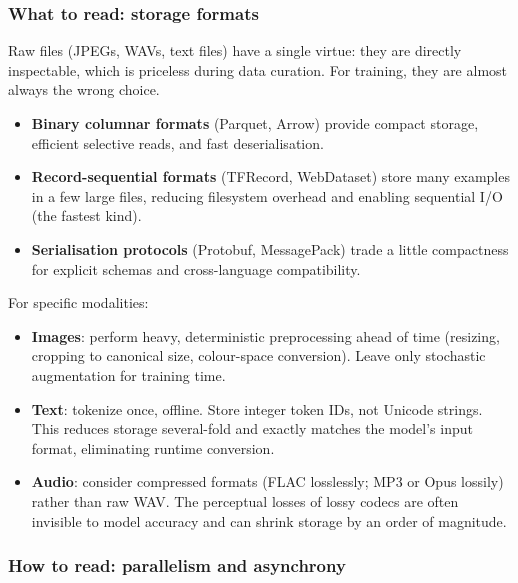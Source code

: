 \documentclass[11pt,a4paper]{article}
\theoremstyle{definition}
\theoremstyle{remark}
\theoremstyle{plain}
\begin{document}
\subsubsection*{What to read: storage formats}

Raw files (JPEGs, WAVs, text files) have a single virtue: they are
directly inspectable, which is priceless during data curation. For
training, they are almost always the wrong choice.

\begin{itemize}[leftmargin=1.5em, itemsep=2pt]
    \item \textbf{Binary columnar formats} (Parquet, Arrow) provide
          compact storage, efficient selective reads, and fast
          deserialisation.
    \item \textbf{Record-sequential formats} (TFRecord, WebDataset) store
          many examples in a few large files, reducing filesystem
          overhead and enabling sequential I/O (the fastest kind).
    \item \textbf{Serialisation protocols} (Protobuf, MessagePack) trade
          a little compactness for explicit schemas and cross-language
          compatibility.
\end{itemize}

For specific modalities:
\begin{itemize}[leftmargin=1.5em, itemsep=2pt]
    \item \textbf{Images}: perform heavy, deterministic preprocessing
          ahead of time (resizing, cropping to canonical size,
          colour-space conversion). Leave only stochastic augmentation
          for training time.
    \item \textbf{Text}: tokenize once, offline. Store integer token IDs,
          not Unicode strings. This reduces storage several-fold and
          exactly matches the model's input format, eliminating runtime
          conversion.
    \item \textbf{Audio}: consider compressed formats (FLAC losslessly;
          MP3 or Opus lossily) rather than raw WAV. The perceptual losses
          of lossy codecs are often invisible to model accuracy and can
          shrink storage by an order of magnitude.
\end{itemize}

\subsubsection*{How to read: parallelism and asynchrony}
\end{document}
